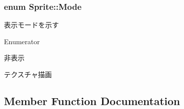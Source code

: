 \subsubsection[{\texorpdfstring{Mode}{Mode}}]{\setlength{\rightskip}{0pt plus 5cm}enum {\bf Sprite\+::\+Mode}\hspace{0.3cm}{\ttfamily [protected]}}\hypertarget{class_sprite_a7e6c7652514341b0ccd721166a1d00d1}{}\label{class_sprite_a7e6c7652514341b0ccd721166a1d00d1}


表示モードを示す 

\begin{Desc}
\item[Enumerator]\par
\begin{description}
\item[{\em 
S\+P\+R\+\_\+\+T\+E\+X\+T\+U\+RE\hypertarget{class_sprite_a7e6c7652514341b0ccd721166a1d00d1a8396f95eb7d47c37ce60278c02644cb3}{}\label{class_sprite_a7e6c7652514341b0ccd721166a1d00d1a8396f95eb7d47c37ce60278c02644cb3}
}]非表示 \item[{\em 
S\+P\+R\+\_\+\+T\+E\+XT\hypertarget{class_sprite_a7e6c7652514341b0ccd721166a1d00d1ab595e70dfd597d3d95865920928895cb}{}\label{class_sprite_a7e6c7652514341b0ccd721166a1d00d1ab595e70dfd597d3d95865920928895cb}
}]テクスチャ描画 \end{description}
\end{Desc}


\subsection{Member Function Documentation}
